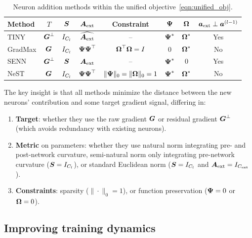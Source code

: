 \begin{table}[t]
\centering
\caption{Neuron addition methods within the unified objective~\eqref{eqn:unified_obj}.}
\label{tab:unified}
\small
\begin{tabular}{lccccccc}
\toprule
\textbf{Method} & $T$ & $\covgrad$ & $\Aext$ & \textbf{Constraint} & $\Fanin$ & $\Fanout$ & $\Postactext \perp \Postact[l-1]$ \\
\midrule
TINY  & $\Bottleneck$ & $I_{\cp}$ & $\widehat{\Aext}$ & -- & $\Fanin^*$ & $\Fanout^*$ & Yes \\
GradMax & $\Gradpreact$ & $I_{\cp}$ & $\Fanin \trans{\Fanin}$ & $\trans{\Fanout}\Fanout = I$ & $0$ & $\Fanout^*$ & No \\
SENN & $\Bottleneck$ & $\covgrad$ & $\Aext$ & -- & $\Fanin^*$ & $0$ & Yes \\
NeST & $\Gradpreact$ & $I_{\cp}$ &  $\Fanin \trans{\Fanin}$ & $\|\Fanin\|_0 = \|\Fanout\|_0 = 1$ & $\Fanin^*$ & $\Fanout^*$ & No \\
\bottomrule
\end{tabular}
\vspace{-1em}
\end{table}

The key insight is that all methods minimize the distance between the new neurons' contribution and some target gradient signal, differing in:
\begin{enumerate}
    \item \textbf{Target}: whether they use the raw gradient $\Gradpreact$ or residual gradient $\Bottleneck$ (which avoids redundancy with existing neurons).
    \item \textbf{Metric} on parameters: whether they use natural norm integrating pre- and post-network curvature, semi-natural norm only integrating pre-network curvature ($\covgrad = I_{\cp}$), or standard Euclidean norm
     ($\covgrad = I_{\cp}$ and $\Aext = I_{\cext}$).
    \item \textbf{Constraints}: sparsity ($\|\cdot\|_0 = 1$), or function preservation ($\Fanin = 0$ or $\Fanout = 0$).
\end{enumerate}

\subsection{Improving training dynamics}
\label{sec:training_dynamics}

